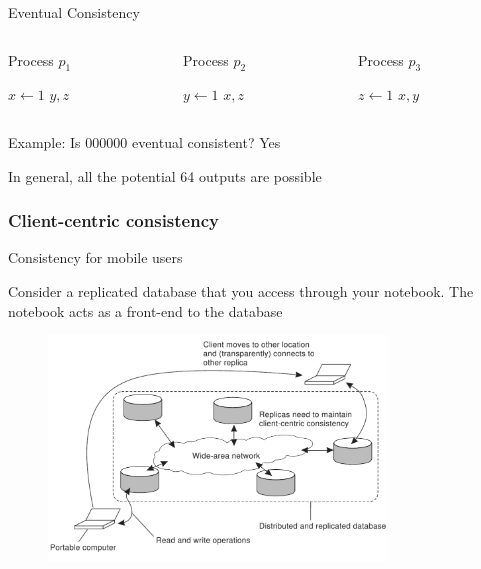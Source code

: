 \begin{frame}{Eventual Consistency}
\begin{columns}
\begin{column}{0.30\textwidth}	
\begin{Procedure}
\caption{Process $p_1$}
$x \gets 1$\;
\PRINT $y,z$
\end{Procedure}
\end{column}
\hfill
\begin{column}{0.30\textwidth}	
\begin{Procedure}
\caption{Process $p_2$}
$y \gets 1$\;
\PRINT $x,z$
\end{Procedure}
\end{column}
\hfill
\begin{column}{0.30\textwidth}	
\begin{Procedure}
\caption{Process $p_3$}
$z \gets 1$\;
\PRINT $x,y$
\end{Procedure}
\end{column}	
\end{columns}

\BIL	
\item Example: Is 000000 eventual consistent?  \pause Yes
\item In general, all the potential 64 outputs are possible
\EIL

\end{frame}

\subsubsection{Client-centric consistency}

\begin{frame}{Consistency for mobile users}

Consider a replicated database that you access through your notebook. 
The notebook acts as a front-end to the database

\begin{figure}
	\includegraphics[width=0.8\textwidth]{mobile}
\end{figure}

\end{frame}

